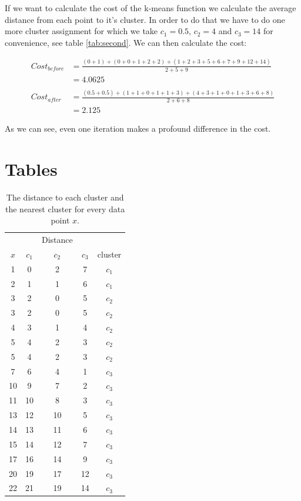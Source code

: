 \documentclass{article}
\begin{document}
If we want to calculate the cost of the k-means function we calculate the average distance from each point to it's cluster. In order to do that we have to do one more cluster assignment for which we take $c_1 = 0.5$, $c_2 = 4$ and $c_3 = 14$ for convenience, see table \ref{tab:second}. We can then calculate the cost:

\begin{align*}
Cost_{before} &= \frac{(0+1)+(0+0+1+2+2) + (1+2+3+5+6+7+9+12+14)}{2+5+9}\\
 &= 4.0625\\
\\
Cost_{after} &= \frac{(0.5+0.5)+(1+1+0+1+1+3)+(4+3+1+0+1+3+6+8)}{2+6+8} \\
&= 2.125
\end{align*}

As we can see, even one iteration makes a profound difference in the cost. 

\section{Tables}

\begin{table}[h!]
\centering
\begin{tabular}{c c c c c}
& & Distance & & \\
 $x$ & $c_1$ & $c_2$ & $c_3$ & cluster\\
\hline
1 & 0 & 2 & 7 &$c_1$\\
2 & 1 & 1 & 6 & $c_1$\\
3 & 2 & 0 & 5 &$c_2$\\
3 & 2 & 0 & 5 & $c_2$\\
4 & 3 & 1  & 4 &$c_2$ \\
5 & 4 & 2 & 3 & $c_2$ \\
5 & 4 & 2 & 3 & $c_2$\\
7 & 6 & 4 & 1 & $c_3$\\
10 & 9  & 7 & 2 &$c_3$ \\
11 & 10  & 8 & 3 & $c_3$\\
13 & 12  & 10 & 5 & $c_3$ \\
14 & 13  & 11 & 6 & $c_3$\\
15 & 14  & 12 & 7 &$c_3$ \\
17 & 16  & 14 & 9 & $c_3$\\
20 & 19  & 17 & 12 &$c_3$ \\
22 & 21  & 19 & 14 & $c_3$ \\
\end{tabular}
\caption{The distance to each cluster and the nearest cluster  for every data point $x$.}
\label{tab:firstit}
\end{table}
\end{document}
